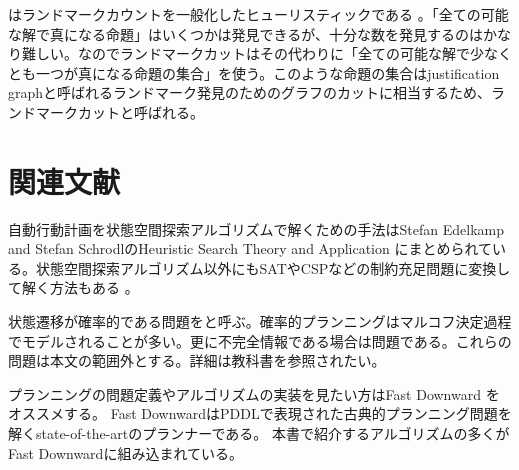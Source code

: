 はランドマークカウントを一般化したヒューリスティックである \cite{helmert:09}。「全ての可能な解で真になる命題」はいくつかは発見できるが、十分な数を発見するのはかなり難しい。なのでランドマークカットはその代わりに「全ての可能な解で少なくとも一つが真になる命題の集合」を使う。このような命題の集合はjustification graphと呼ばれるランドマーク発見のためのグラフのカットに相当するため、ランドマークカットと呼ばれる。


\section{関連文献}

自動行動計画を状態空間探索アルゴリズムで解くための手法はStefan Edelkamp and Stefan SchrodlのHeuristic Search Theory and Application \cite{edelkamp:2010:hst:1875144}にまとめられている。状態空間探索アルゴリズム以外にもSATやCSPなどの制約充足問題に変換して解く方法もある \cite{ernst1997automatic,do2001planning,sharon2015conflict}。

状態遷移が確率的である問題をと呼ぶ。確率的プランニングはマルコフ決定過程でモデルされることが多い。更に不完全情報である場合は問題である。これらの問題は本文の範囲外とする。詳細は教科書を参照されたい\cite{russelln03}。

プランニングの問題定義やアルゴリズムの実装を見たい方はFast Downward \cite{helmert2006}をオススメする。
Fast DownwardはPDDLで表現された古典的プランニング問題を解くstate-of-the-artのプランナーである。
本書で紹介するアルゴリズムの多くがFast Downwardに組み込まれている。
